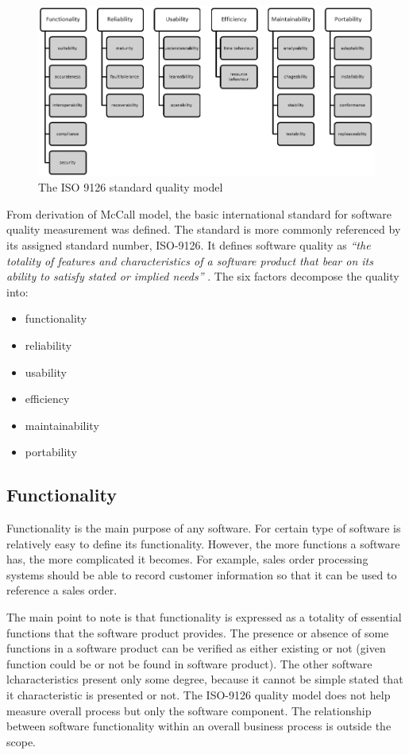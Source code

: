 \begin{figure}[h!]
	\centering
	\includegraphics[scale=0.6]{img/diag.png} 
	\caption{The ISO 9126 standard quality model}		
	\label{fig:iso9126}
\end{figure}

From derivation of McCall model, the basic international standard for software quality measurement was defined. The standard is more commonly referenced by its assigned standard number, ISO-9126. It defines software quality as\textit{ ``the totality of features and characteristics of a software product that bear on its ability to satisfy stated or implied needs''} \cite{ISO9126}. The six factors decompose the quality into: 

\begin{itemize}
  \item functionality 
  \item reliability
  \item usability
  \item efficiency
  \item maintainability
  \item portability   
  \end{itemize}
    
\subsection{Functionality}
Functionality is the main purpose of any software. For certain type of software is relatively easy to define its functionality. However, the more functions a software has, the more complicated it becomes. For example, sales order processing systems should be able to record customer information so that it can be used to reference a sales order.

The main point to note is that functionality is expressed as a totality of essential functions that the software product provides. The presence or absence of some functions in a software product can be verified as either existing or not (given function could be or not be found in software product). The other software lcharacteristics present only some degree, because it cannot be simple stated that it characteristic is presented or not. The ISO-9126 quality model does not help measure overall process but only the software component. The relationship between software functionality within an overall business process is outside the scope.

